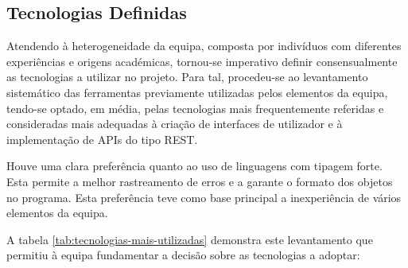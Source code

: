 

\subsection{Tecnologias Definidas}

Atendendo à heterogeneidade da equipa, composta por indivíduos com diferentes experiências e origens académicas, tornou-se imperativo definir consensualmente as tecnologias a utilizar no projeto. Para tal, procedeu-se ao levantamento sistemático das ferramentas previamente utilizadas pelos elementos da equipa, tendo-se optado, em média, pelas tecnologias mais frequentemente referidas e consideradas mais adequadas à criação de interfaces de utilizador e à implementação de APIs do tipo REST.



Houve uma clara preferência quanto ao uso de linguagens com tipagem forte. Esta permite a melhor rastreamento de erros e a garante o formato dos objetos no programa. Esta preferência teve como base principal a inexperiência de vários elementos da equipa.

A tabela \ref{tab:tecnologias-mais-utilizadas} demonstra este levantamento que permitiu à equipa fundamentar a decisão sobre as tecnologias a adoptar:

